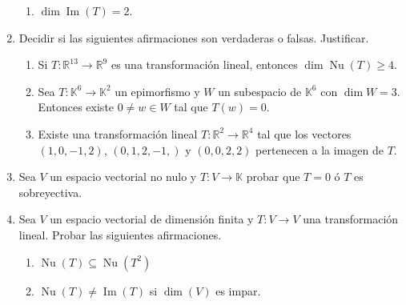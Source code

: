 \begin{enumerate}[topsep=6pt, itemsep=.4cm]
\begin{enumerate}[ topsep=5pt,itemsep=5pt]
        \item\label{usar-1 f} $\operatorname{dim} \operatorname{Im}(T)=2$.
    \end{enumerate}
        
    \rta 


    \item Decidir si las siguientes afirmaciones son verdaderas o falsas. Justificar.
    \begin{enumerate}
        \item\label{tl-VoF-a} Si $T : \mathbb R^{13} \to \mathbb R^9$ es una transformación lineal, entonces $\dim \operatorname{Nu}(T) \geq  4$.
        \item\label{tl-VoF-b} Sea $T:\mathbb{K}^{6}\longrightarrow\mathbb{K}^2$ un epimorfismo y $W$ un subespacio de $\mathbb{K}^{6}$ con $\dim W=3$. Entonces existe $0\neq w\in W$ tal que $T(w)=0$.
        \item\label{tl-VoF-c} Existe una transformación lineal $T : \mathbb R^2 \to \mathbb R^4$ tal que los vectores $(1, 0, -1, 2)$, $(0, 1, 2,-1,)$ y $(0, 0, 2, 2)$ pertenecen a la imagen de $T$.
    \end{enumerate}
    
    \rta



    \item \label{funcionales} Sea $V$ un espacio vectorial no nulo y $T:V\longrightarrow\mathbb{K}$ probar que $T=0$ ó $T$ es sobreyectiva.
    
    \rta


    \item Sea $V$ un espacio vectorial de dimensión finita y $T:V\longrightarrow V$ una transformación lineal. Probar las siguientes afirmaciones.
        \begin{multicols}{2}
            \begin{enumerate}
                \item $\operatorname{Nu}(T)\subseteq\operatorname{Nu}(T^2)$
                \item\label{dimV impar} $\operatorname{Nu}(T)\neq\operatorname{Im}(T)$ si $\dim(V)$ es impar.
            \end{enumerate}
        \end{multicols}
    
    \rta
        
    \end{enumerate}